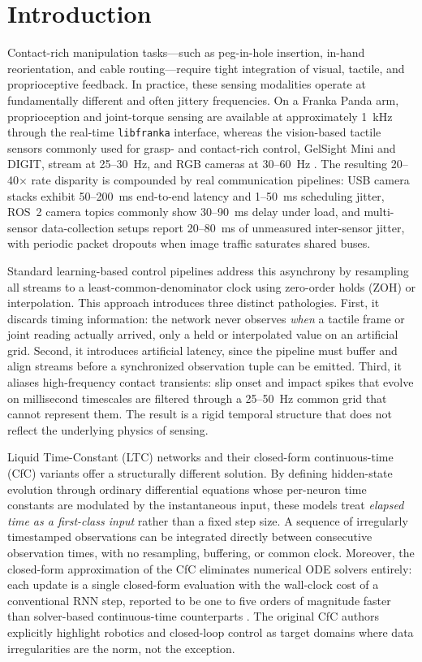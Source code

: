 \documentclass[conference]{IEEEtran}
\begin{document}
\section{Introduction}
\label{sec:intro}
Contact-rich manipulation tasks---such as peg-in-hole insertion, in-hand reorientation, and cable routing---require tight integration of visual, tactile, and proprioceptive feedback. In practice, these sensing modalities operate at fundamentally different and often jittery frequencies. On a Franka Panda arm, proprioception and joint-torque sensing are available at approximately 1~kHz through the real-time \texttt{libfranka} interface, whereas the vision-based tactile sensors commonly used for grasp- and contact-rich control, GelSight Mini and DIGIT, stream at 25--30~Hz, and RGB cameras at 30--60~Hz \cite{franka_libfranka,yuan2017gelsight,lambeta2020digit}. The resulting 20--40$\times$ rate disparity is compounded by real communication pipelines: USB camera stacks exhibit 50--200~ms end-to-end latency and 1--50~ms scheduling jitter, ROS~2 camera topics commonly show 30--90~ms delay under load, and multi-sensor data-collection setups report 20--80~ms of unmeasured inter-sensor jitter, with periodic packet dropouts when image traffic saturates shared buses.

Standard learning-based control pipelines address this asynchrony by resampling all streams to a least-common-denominator clock using zero-order holds (ZOH) or interpolation. This approach introduces three distinct pathologies. First, it discards timing information: the network never observes \emph{when} a tactile frame or joint reading actually arrived, only a held or interpolated value on an artificial grid. Second, it introduces artificial latency, since the pipeline must buffer and align streams before a synchronized observation tuple can be emitted. Third, it aliases high-frequency contact transients: slip onset and impact spikes that evolve on millisecond timescales are filtered through a 25--50~Hz common grid that cannot represent them. The result is a rigid temporal structure that does not reflect the underlying physics of sensing.

Liquid Time-Constant (LTC) networks \cite{hasani2021ltc} and their closed-form continuous-time (CfC) variants \cite{hasani2022cfc} offer a structurally different solution. By defining hidden-state evolution through ordinary differential equations whose per-neuron time constants are modulated by the instantaneous input, these models treat \emph{elapsed time as a first-class input} rather than a fixed step size. A sequence of irregularly timestamped observations can be integrated directly between consecutive observation times, with no resampling, buffering, or common clock. Moreover, the closed-form approximation of the CfC eliminates numerical ODE solvers entirely: each update is a single closed-form evaluation with the wall-clock cost of a conventional RNN step, reported to be one to five orders of magnitude faster than solver-based continuous-time counterparts \cite{hasani2022cfc}. The original CfC authors explicitly highlight robotics and closed-loop control as target domains where data irregularities are the norm, not the exception.
\end{document}
